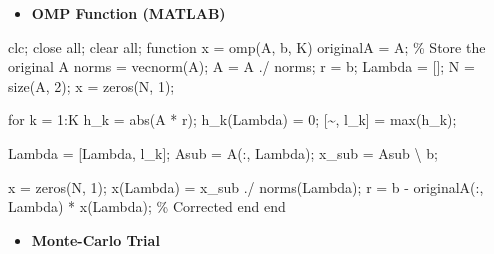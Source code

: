 \documentclass[
  letterpaper,
  DIV=11,
  numbers=noendperiod]{scrartcl}
\newenvironment{Shaded}{\begin{snugshade}}{\end{snugshade}}
\newcommand{\NormalTok}[1]{\textcolor[rgb]{0.97,0.97,0.95}{#1}}
\providecommand{\tightlist}{%
  \setlength{\itemsep}{0pt}\setlength{\parskip}{0pt}}
\begin{document}
\begin{itemize}
\tightlist
\item
  \textbf{OMP Function (MATLAB)}
\end{itemize}

\begin{Shaded}
\begin{Highlighting}[]
\NormalTok{clc; close all; clear all;}
\NormalTok{function x = omp(A, b, K)}
\NormalTok{    originalA = A;               \% Store the original A}
\NormalTok{    norms = vecnorm(A);}
\NormalTok{    A = A ./ norms;}
\NormalTok{    r = b;}
\NormalTok{    Lambda = [];}
\NormalTok{    N = size(A, 2);}
\NormalTok{    x = zeros(N, 1);}

\NormalTok{    for k = 1:K}
\NormalTok{        h\_k = abs(A\textquotesingle{} * r);}
\NormalTok{        h\_k(Lambda) = 0;}
\NormalTok{        [\textasciitilde{}, l\_k] = max(h\_k);}

\NormalTok{        Lambda = [Lambda, l\_k];}
\NormalTok{        Asub = A(:, Lambda);}
\NormalTok{        x\_sub = Asub \textbackslash{} b;}

\NormalTok{        x = zeros(N, 1);}
\NormalTok{        x(Lambda) = x\_sub ./ norms(Lambda)\textquotesingle{};}
\NormalTok{        r = b {-} originalA(:, Lambda) * x(Lambda);   \% Corrected}
\NormalTok{    end}
\NormalTok{end}
\end{Highlighting}
\end{Shaded}

\begin{itemize}
\tightlist
\item
  \textbf{Monte-Carlo Trial}
\end{itemize}
\end{document}
